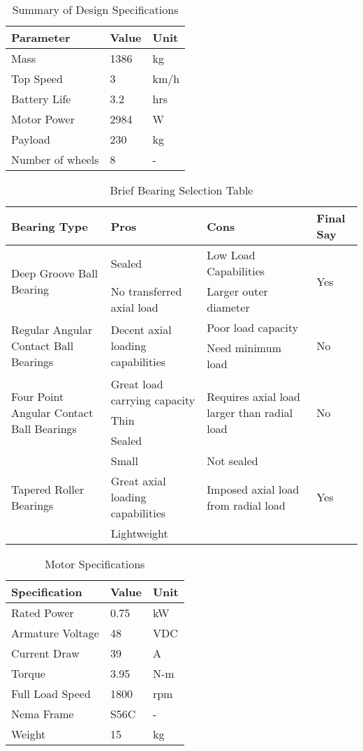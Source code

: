 \begin{table}[htbp]
\centering
\caption{Summary of Design Specifications}
\begin{tabular}{| lll |} \hline
Parameter & Value & Unit \\ \hline
Mass & 1386 & kg \\
Top Speed & 3 & km/h \\
Battery Life & 3.2 & hrs \\
Motor Power & 2984 & W \\
Payload & 230 & kg \\
Number of wheels & 8 & - \\ \hline
\end{tabular}
\label{tab:design_spec}
\end{table}
 
\begin{table}[htbp]
\centering
\caption{Brief Bearing Selection Table}
\begin{tabular}{| p{4cm}p{4cm}p{4cm}l |} \hline
Bearing Type & Pros & Cons & Final Say \\ \hline
\multirow{2}{4cm}{Deep Groove Ball Bearing} & Sealed & Low Load Capabilities & \multirow{2}{*}{Yes} \\
& No transferred axial load & Larger outer diameter & \\ \hline
\multirow{2}{4cm}{Regular Angular Contact Ball Bearings} & \multirow{2}{4cm}{Decent axial loading capabilities} & Poor load capacity & \multirow{2}{*}{No} \\
& & Need minimum load & \\ \hline
\multirow{3}{4cm}{Four Point Angular Contact Ball Bearings} & Great load carrying capacity & \multirow{3}{4cm}{Requires axial load larger than radial load} & \multirow{3}{*}{No} \\
& Thin & & \\
& Sealed & & \\ \hline
\multirow{3}{4cm}{Tapered Roller Bearings} & Small & Not sealed & \multirow{3}{*}{Yes} \\
& Great axial loading capabilities & Imposed axial load from radial load & \\
& Lightweight & & \\ \hline
\end{tabular}
\label{tab:bearing_selection}
\end{table}


  \begin{table}[htbp]
 \centering
 \caption{Motor Specifications}
 \begin{tabular}{| lll |} \hline
 Specification & Value & Unit \\ \hline
Rated Power & 0.75 & kW \\
Armature Voltage & 48 & VDC \\
Current Draw & 39 & A \\
Torque & 3.95 & N-m \\
Full Load Speed & 1800 & rpm \\
Nema Frame & S56C & - \\
Weight & 15 & kg \\ \hline
 \end{tabular}
 \label{tab:motor_spec}
 \end{table}
 
 